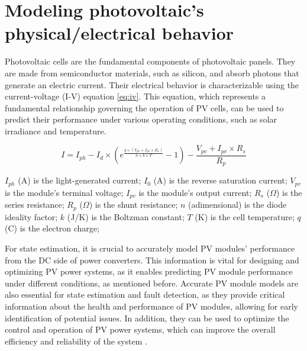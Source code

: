 \section{Modeling photovoltaic's physical/electrical behavior}

Photovoltaic cells are the fundamental components of photovoltaic panels. They are made from semiconductor materials, such as silicon,  and absorb photons that generate an electric current. Their electrical behavior is characterizable using the current-voltage (I-V) equation \ref{eq:iv}. This equation, which represents a fundamental relationship governing the operation of PV cells, can be used to predict their performance under various operating conditions, such as solar irradiance and temperature.

\begin{equation} \label{eq:iv}
    I = I_{ph} - I_d \times (e^{\frac{q \times (V_{pv} + I_{pv} \times R_{s})}{n \times k \times T}} - 1) - \frac{V_{pv} + I_{pv} \times R_s}{R_p}
\end{equation}

$I_{ph}$ (A) is the light-generated current;
$I_{0}$ (A) is the reverse saturation current;
$V_{pv}$ is the module's terminal voltage;
$I_{pv}$ is the module's output current;
$R_{s}$ ($\Omega$) is the series resistance;
$R_{p}$ ($\Omega$) is the shunt resistance;
$n$ (adimensional) is the diode ideality factor;
$k$ (J/K) is the Boltzman constant;
$T$ (K) is the cell temperature;
$q$ (C) is the electron charge;

For state estimation, it is crucial to accurately model PV modules' performance from the DC side of power converters. This information is vital for designing and optimizing PV power systems, as it enables predicting PV module performance under different conditions, as mentioned before. Accurate PV module models are also essential for state estimation and fault detection, as they provide critical information about the health and performance of PV modules, allowing for early identification of potential issues. In addition, they can be used to optimize the control and operation of PV power systems, which can improve the overall efficiency and reliability of the system \cite{Braun2011}.

